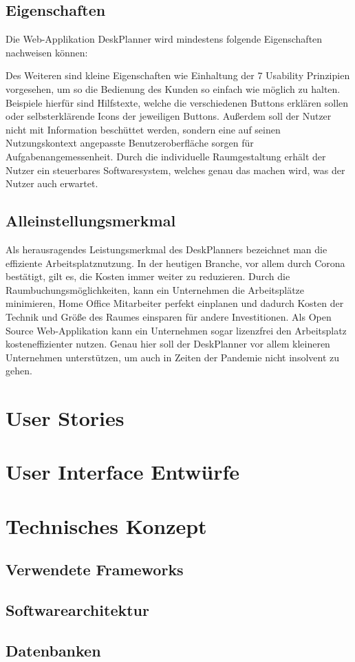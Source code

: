 \documentclass{article}
\begin{document}
\subsection{Eigenschaften}
Die Web-Applikation DeskPlanner wird mindestens folgende Eigenschaften nachweisen können:

Des Weiteren sind kleine Eigenschaften wie Einhaltung der 7 Usability Prinzipien vorgesehen, um so die Bedienung des Kunden so einfach wie möglich zu halten. 
Beispiele hierfür sind Hilfstexte, welche die verschiedenen Buttons erklären sollen oder selbsterklärende Icons der jeweiligen Buttons. 
Außerdem soll der Nutzer nicht mit Information beschüttet werden, sondern eine auf seinen Nutzungskontext angepasste Benutzeroberfläche sorgen für Aufgabenangemessenheit. 
Durch die individuelle Raumgestaltung erhält der Nutzer ein steuerbares Softwaresystem, welches genau das machen wird, was der Nutzer auch erwartet.

\subsection{Alleinstellungsmerkmal}
Als herausragendes Leistungsmerkmal des DeskPlanners bezeichnet man die effiziente Arbeitsplatznutzung. 
In der heutigen Branche, vor allem durch Corona bestätigt, gilt es, die Kosten immer weiter zu reduzieren. 
Durch die Raumbuchungsmöglichkeiten, kann ein Unternehmen die Arbeitsplätze minimieren, Home Office Mitarbeiter perfekt einplanen und dadurch Kosten der Technik und Größe des Raumes einsparen für andere Investitionen. 
Als Open Source Web-Applikation kann ein Unternehmen sogar lizenzfrei den Arbeitsplatz kosteneffizienter nutzen.
Genau hier soll der DeskPlanner vor allem kleineren Unternehmen unterstützen, um auch in Zeiten der Pandemie nicht insolvent zu gehen.

\section{User Stories}

\section{User Interface Entwürfe}

\section{Technisches Konzept}

\subsection{Verwendete Frameworks}

\subsection{Softwarearchitektur}

\subsection{Datenbanken}

% 


\end{document}
